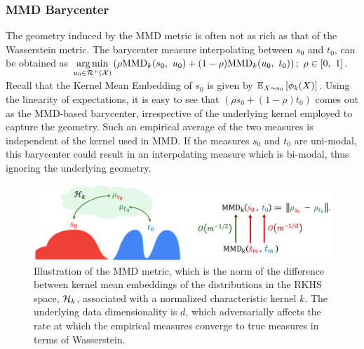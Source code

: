\subsubsection{MMD Barycenter}
The geometry induced by the MMD metric is often not as rich as that of the Wasserstein metric. The barycenter measure interpolating between $s_0$ and $t_0$, can be obtained as $\argmin_{u_0\in \calR^+(\calX)} \left(\rho \MMD_k(s_0, \ u_0)+(1-\rho)\MMD_k(u_0, \ t_0)\right);\ \rho\in[0,\ 1]$. Recall that the Kernel Mean Embedding of $s_0$ is given by $\mathbb{E}_{X\sim s_0}\left[\phi_k(X)\right]$. Using the linearity of expectations, it is easy to see that $\left(\rho s_0+(1-\rho)t_0\right)$ comes out as the MMD-based barycenter, irrespective of the underlying kernel employed to capture the geometry. Such an empirical average of the two measures is independent of the kernel used in MMD. If the measures $s_0$ and $t_0$ are uni-modal, this barycenter could result in an interpolating measure which is bi-modal, thus ignoring the underlying geometry.
\begin{figure}[t]
    \centering
    \includegraphics[width=0.9\linewidth]{background/images/MMD.pdf}
    \caption[Illustration of the MMD metric.]{Illustration of the MMD metric, which is the norm of the difference between kernel mean embeddings of the distributions in the RKHS space, $\mathcal{H}_k$, associated with a normalized characteristic kernel $k$. The underlying data dimensionality is $d$, which adversarially affects the rate at which the empirical measures converge to true measures in terms of Wasserstein.}
    \label{fig:MMD}
\end{figure}
\resumetoc

